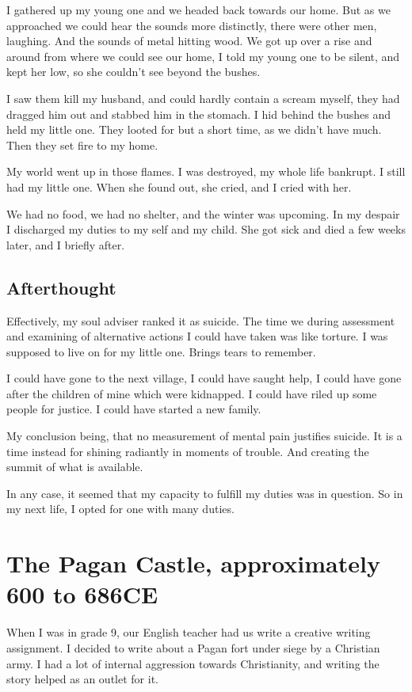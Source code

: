 I gathered up my young one and we headed back towards our home. But as we
approached we could hear the sounds more distinctly, there were other men,
laughing. And the sounds of metal hitting wood.
We got up over a rise and around from where we could see our home, 
I told my young one to be silent, and kept her low, so she couldn't see 
beyond the bushes. 

I saw them kill my husband, and could hardly contain a scream myself, they had
dragged him out and stabbed him in the stomach. I hid behind the bushes and held
my little one.  They looted for but a short time, as we didn't have much. Then
they set fire to my home. 

My world went up in those flames. I was destroyed, my whole life bankrupt. I
still had my little one. When she found out, she cried, and I cried with her.

We had no food, we had no shelter, and the winter was upcoming. In my despair I
discharged my duties to my self and my child. She got sick and died a few weeks
later, and I briefly after. 

\section{Afterthought}

Effectively, my soul adviser ranked it as suicide. The time we during assessment
and examining of alternative actions I could have taken was like torture. 
I was supposed to live on for my little one. Brings tears to remember.

I could have gone to the next village, I could have saught help, I could have
gone after the children of mine which were kidnapped. I could have riled up some
people for justice. I could have started a new family.

My conclusion being, that no measurement of mental pain justifies suicide. It
is a time instead for shining radiantly in moments of trouble. And creating the
summit of what is available. 

In any case, it seemed that my capacity to fulfill my duties was in question. So
in my next life, I opted for one with many duties.

\chapter{The Pagan Castle, approximately 600 to 686CE}
\label{reincarnation:arwald}
When I was in grade 9, our English teacher had us write a creative writing
assignment. I decided to write about a Pagan fort under siege by a Christian
army.  I had a lot of internal aggression towards Christianity, and writing the
story helped as an outlet for it. 

